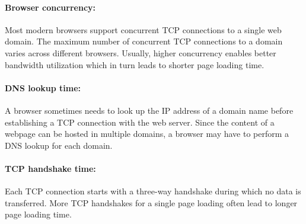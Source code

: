 
\paragraph{Browser concurrency:} Most modern browsers support concurrent 
TCP connections to a single web domain. The maximum number of concurrent 
TCP connections to a domain varies across different browsers. Usually, 
higher concurrency enables better bandwidth utilization which in turn 
leads to shorter page loading time.


\paragraph{DNS lookup time:} A browser sometimes needs to look up the IP
address of a domain name before establishing a TCP connection with the
web server. Since the content of a webpage can be hosted in multiple 
domains, a browser may have to perform a DNS lookup for each domain. 


\paragraph{TCP handshake time:} Each TCP connection starts with a
three-way handshake during which no data is transferred. More TCP 
handshakes for a single page loading often lead to longer page loading 
time.

